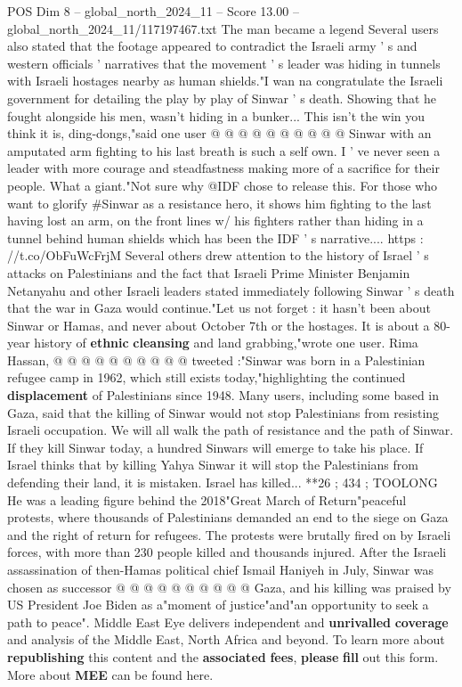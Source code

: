 \begin{textsample}{POS Dim 8 – global\_north\_2024\_11 – Score 13.00 – global\_north\_2024\_11/117197467.txt}
The man became a legend Several users also stated that the footage appeared to contradict the Israeli army ' s and western officials ' narratives that the movement ' s leader was hiding in tunnels with Israeli hostages nearby as human shields."I wan na congratulate the Israeli government for detailing the play by play of Sinwar ' s death.
Showing that he fought alongside his men, wasn't hiding in a bunker...
This isn't the win you think it is, ding-dongs,"said one user @ @ @ @ @ @ @ @ @ @ Sinwar with an amputated arm fighting to his last breath is such a self own.
I ' ve never seen a leader with more courage and steadfastness making more of a sacrifice for their people.
What a giant."Not sure why @IDF chose to release this.
For those who want to glorify \#Sinwar as a resistance hero, it shows him fighting to the last having lost an arm, on the front lines w/ his fighters rather than hiding in a tunnel behind human shields which has been the IDF ' s narrative.... https : //t.co/ObFuWcFrjM Several others drew attention to the history of Israel ' s attacks on Palestinians and the fact that Israeli Prime Minister Benjamin Netanyahu and other Israeli leaders stated immediately following Sinwar ' s death that the war in Gaza would continue."Let us not forget : it hasn't been about Sinwar or Hamas, and never about October 7th or the hostages.
It is about a 80-year history of \textbf{ethnic} \textbf{cleansing} and land grabbing,"wrote one user.
Rima Hassan, @ @ @ @ @ @ @ @ @ @ tweeted :"Sinwar was born in a Palestinian refugee camp in 1962, which still exists today,"highlighting the continued \textbf{displacement} of Palestinians since 1948.
Many users, including some based in Gaza, said that the killing of Sinwar would not stop Palestinians from resisting Israeli occupation.
We will all walk the path of resistance and the path of Sinwar.
If they kill Sinwar today, a hundred Sinwars will emerge to take his place.
If Israel thinks that by killing Yahya Sinwar it will stop the Palestinians from defending their land, it is mistaken.
Israel has killed... **26 ; 434 ; TOOLONG He was a leading figure behind the 2018"Great March of Return"peaceful protests, where thousands of Palestinians demanded an end to the siege on Gaza and the right of return for refugees.
The protests were brutally fired on by Israeli forces, with more than 230 people killed and thousands injured.
After the Israeli assassination of then-Hamas political chief Ismail Haniyeh in July, Sinwar was chosen as successor @ @ @ @ @ @ @ @ @ @ Gaza, and his killing was praised by US President Joe Biden as a"moment of justice"and"an opportunity to seek a path to peace".
Middle East Eye delivers independent and \textbf{unrivalled} \textbf{coverage} and analysis of the Middle East, North Africa and beyond.
To learn more about \textbf{republishing} this content and the \textbf{associated} \textbf{fees}, \textbf{please} \textbf{fill} out this form.
More about \textbf{MEE} can be found here.

\end{textsample}
